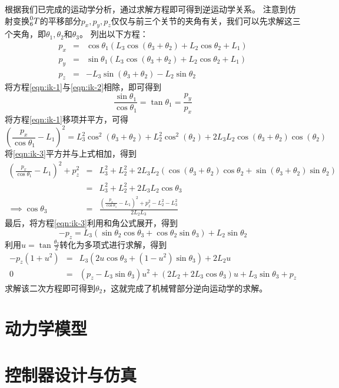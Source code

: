 \documentclass{ctexart}
\begin{document}
根据我们已完成的运动学分析，通过求解方程即可得到逆运动学关系。
注意到仿射变换$\prescript{0}{6}{T}$的平移部分$p_x, p_y, p_z$仅仅与前三个关节的夹角有关，我们可以先求解这三个夹角，即$\theta_1, \theta_2$和$\theta_3$。
列出以下方程：
\begin{eqnarray}
    \label{eqn:ik-1}
    p_x & = & \cos{\theta_1} \left( {L_3} \cos{\left( {{\theta }_3}+{{\theta }_2}\right) }+{L_2} \cos{\theta_2}+{L_1}\right) \\
    \label{eqn:ik-2}
    p_y & = & \sin{\theta_1} \left( {L_3} \cos{\left( {{\theta }_3}+{{\theta }_2}\right) }+{L_2} \cos{\theta_2}+{L_1}\right)  \\
    \label{eqn:ik-3}
    p_z & = & -{L_3} \sin{\left( {{\theta }_3}+{{\theta }_2}\right) } -{L_2} \sin{\theta_2}
\end{eqnarray}
将方程\eqref{eqn:ik-1}与\eqref{eqn:ik-2}相除，即可得到
\begin{equation}
    \label{eqn:ik-theta-one}
    \frac{\sin \theta_1}{\cos \theta_1} = \tan \theta_1 = \frac{p_y}{p_x}
\end{equation}
将方程\eqref{eqn:ik-1}移项并平方，可得
\begin{equation*}
    \left( \frac{p_x}{\cos \theta_1} - L_1 \right)^2 =
    L_3^2 \cos^2(\theta_3 + \theta_2) + L_2^2 \cos^2 (\theta_2) + 2 L_3 L_2 \cos (\theta_3 + \theta_2) \cos (\theta_2)
\end{equation*}
将\eqref{eqn:ik-3}平方并与上式相加，得到
\begin{eqnarray}
    \label{eqn:ik-theta-three}
    \left( \frac{p_x}{\cos \theta_1} - L_1 \right)^2 + p_z^2 
    & = & L_3^2 + L_2^2 + 2 L_3 L_2 \left( \cos(\theta_3 + \theta_2) \cos \theta_2 + \sin(\theta_3 + \theta_2) \sin \theta_2 \right) \nonumber \\
    & = & L_3^2 + L_2^2 + 2 L_3 L_2 \cos \theta_3 \nonumber \\
    \implies \cos \theta_3 & = & \frac{\left( \frac{p_x}{\cos \theta_1} - L_1 \right)^2 + p_z^2 - L_2^2 - L_3^2}{2 L_2 L_3}
\end{eqnarray}
最后，将方程\eqref{eqn:ik-3}利用和角公式展开，得到
\begin{equation*}
    - p_z = L_3 (\sin \theta_2 \cos \theta_3 + \cos \theta_2 \sin \theta_3) + L_2 \sin \theta_2
\end{equation*}
利用$u = \tan \frac{\theta_2}{2}$转化为多项式进行求解，得到
\begin{eqnarray*}
    - p_z (1 + u^2) &=& L_3 (2u \cos \theta_3 + (1 - u^2) \sin \theta_3) + 2 L_2 u \\
    0 &=& (p_z - L_3 \sin \theta_3) u^2 + (2 L_2 + 2 L_3 \cos \theta_3) u + L_3 \sin \theta_3 + p_z
\end{eqnarray*}
求解该二次方程即可得到$\theta_2$，这就完成了机械臂部分逆向运动学的求解。

\section{动力学模型}

\section{控制器设计与仿真}
\end{document}
